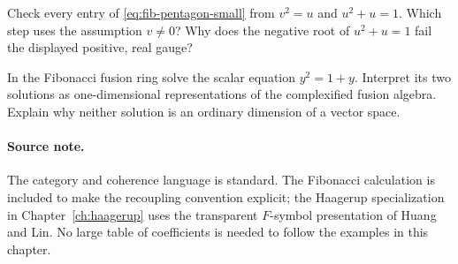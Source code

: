 \begin{exercise}\label{ex:fib-pentagon}
Check every entry of \eqref{eq:fib-pentagon-small} from
$v^2=u$ and $u^2+u=1$.  Which step uses the assumption $v\ne0$?
Why does the negative root of $u^2+u=1$ fail the displayed positive,
real gauge?

\par\smallskip{}\par
\end{exercise}

\begin{exercise}\label{ex:dimension-not-state}
In the Fibonacci fusion ring solve the scalar equation
$y^2=1+y$.  Interpret its two solutions as one-dimensional
representations of the complexified fusion algebra.  Explain why
neither solution is an ordinary dimension of a vector space.

\par\smallskip{}\par
\end{exercise}

\paragraph{Source note.}
The category and coherence language is standard.  The Fibonacci
calculation is included to make the recoupling convention explicit;
the Haagerup specialization in Chapter~\ref{ch:haagerup} uses the transparent
$F$-symbol presentation of Huang and Lin.  No large table of
coefficients is needed to follow the examples in this chapter.
